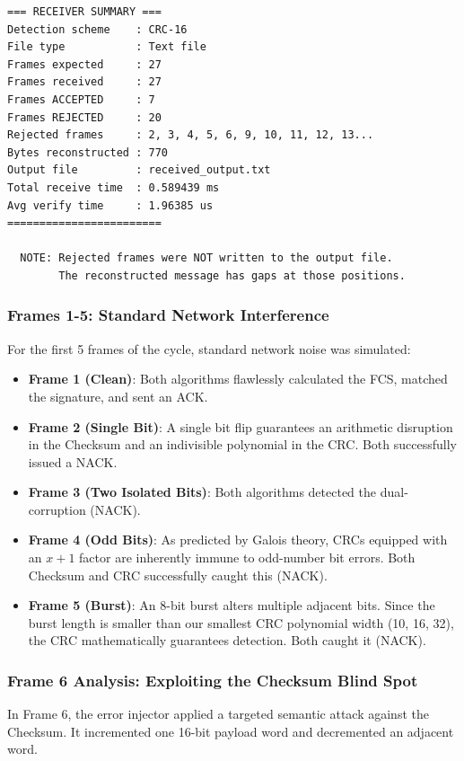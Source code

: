 \documentclass[12pt, a4paper]{article}
\begin{document}
\begin{scriptsize}
\begin{verbatim}
=== RECEIVER SUMMARY ===
Detection scheme    : CRC-16
File type           : Text file
Frames expected     : 27
Frames received     : 27
Frames ACCEPTED     : 7
Frames REJECTED     : 20
Rejected frames     : 2, 3, 4, 5, 6, 9, 10, 11, 12, 13...
Bytes reconstructed : 770
Output file         : received_output.txt
Total receive time  : 0.589439 ms
Avg verify time     : 1.96385 us
========================

  NOTE: Rejected frames were NOT written to the output file.
        The reconstructed message has gaps at those positions.

\end{verbatim}
\end{scriptsize}


\subsubsection{Frames 1-5: Standard Network Interference}
For the first 5 frames of the cycle, standard network noise was simulated:
\begin{itemize}
    \item \textbf{Frame 1 (Clean)}: Both algorithms flawlessly calculated the FCS, matched the signature, and sent an ACK.
    \item \textbf{Frame 2 (Single Bit)}: A single bit flip guarantees an arithmetic disruption in the Checksum and an indivisible polynomial in the CRC. Both successfully issued a NACK.
    \item \textbf{Frame 3 (Two Isolated Bits)}: Both algorithms detected the dual-corruption (NACK).
    \item \textbf{Frame 4 (Odd Bits)}: As predicted by Galois theory, CRCs equipped with an $x+1$ factor are inherently immune to odd-number bit errors. Both Checksum and CRC successfully caught this (NACK).
    \item \textbf{Frame 5 (Burst)}: An 8-bit burst alters multiple adjacent bits. Since the burst length is smaller than our smallest CRC polynomial width (10, 16, 32), the CRC mathematically guarantees detection. Both caught it (NACK).
\end{itemize}

\subsubsection{Frame 6 Analysis: Exploiting the Checksum Blind Spot}
In Frame 6, the error injector applied a targeted semantic attack against the Checksum. It incremented one 16-bit payload word and decremented an adjacent word. 
\end{document}
